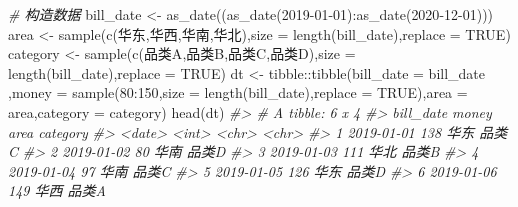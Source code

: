 \documentclass[
]{book}
\newenvironment{Shaded}{\begin{snugshade}}{\end{snugshade}}
\newcommand{\AttributeTok}[1]{\textcolor[rgb]{0.77,0.63,0.00}{#1}}
\newcommand{\CommentTok}[1]{\textcolor[rgb]{0.56,0.35,0.01}{\textit{#1}}}
\newcommand{\ConstantTok}[1]{\textcolor[rgb]{0.00,0.00,0.00}{#1}}
\newcommand{\DecValTok}[1]{\textcolor[rgb]{0.00,0.00,0.81}{#1}}
\newcommand{\FunctionTok}[1]{\textcolor[rgb]{0.00,0.00,0.00}{#1}}
\newcommand{\NormalTok}[1]{#1}
\newcommand{\OtherTok}[1]{\textcolor[rgb]{0.56,0.35,0.01}{#1}}
\newcommand{\SpecialCharTok}[1]{\textcolor[rgb]{0.00,0.00,0.00}{#1}}
\newcommand{\StringTok}[1]{\textcolor[rgb]{0.31,0.60,0.02}{#1}}
\begin{document}
\begin{Shaded}
\begin{Highlighting}[]
\CommentTok{\# 构造数据}
\NormalTok{bill\_date }\OtherTok{\textless{}{-}} \FunctionTok{as\_date}\NormalTok{((}\FunctionTok{as\_date}\NormalTok{(}\StringTok{\textquotesingle{}2019{-}01{-}01\textquotesingle{}}\NormalTok{)}\SpecialCharTok{:}\FunctionTok{as\_date}\NormalTok{(}\StringTok{\textquotesingle{}2020{-}12{-}01\textquotesingle{}}\NormalTok{)))}
\NormalTok{area }\OtherTok{\textless{}{-}}  \FunctionTok{sample}\NormalTok{(}\FunctionTok{c}\NormalTok{(}\StringTok{\textquotesingle{}华东\textquotesingle{}}\NormalTok{,}\StringTok{\textquotesingle{}华西\textquotesingle{}}\NormalTok{,}\StringTok{\textquotesingle{}华南\textquotesingle{}}\NormalTok{,}\StringTok{\textquotesingle{}华北\textquotesingle{}}\NormalTok{),}\AttributeTok{size =} \FunctionTok{length}\NormalTok{(bill\_date),}\AttributeTok{replace =} \ConstantTok{TRUE}\NormalTok{)}
\NormalTok{category }\OtherTok{\textless{}{-}} \FunctionTok{sample}\NormalTok{(}\FunctionTok{c}\NormalTok{(}\StringTok{\textquotesingle{}品类A\textquotesingle{}}\NormalTok{,}\StringTok{\textquotesingle{}品类B\textquotesingle{}}\NormalTok{,}\StringTok{\textquotesingle{}品类C\textquotesingle{}}\NormalTok{,}\StringTok{\textquotesingle{}品类D\textquotesingle{}}\NormalTok{),}\AttributeTok{size =} \FunctionTok{length}\NormalTok{(bill\_date),}\AttributeTok{replace =} \ConstantTok{TRUE}\NormalTok{)}
\NormalTok{dt }\OtherTok{\textless{}{-}}\NormalTok{ tibble}\SpecialCharTok{::}\FunctionTok{tibble}\NormalTok{(}\AttributeTok{bill\_date =}\NormalTok{ bill\_date ,}\AttributeTok{money =} \FunctionTok{sample}\NormalTok{(}\DecValTok{80}\SpecialCharTok{:}\DecValTok{150}\NormalTok{,}\AttributeTok{size =} \FunctionTok{length}\NormalTok{(bill\_date),}\AttributeTok{replace =} \ConstantTok{TRUE}\NormalTok{),}\AttributeTok{area =}\NormalTok{ area,}\AttributeTok{category =}\NormalTok{ category)}
\FunctionTok{head}\NormalTok{(dt)}
\CommentTok{\#\textgreater{} \# A tibble: 6 x 4}
\CommentTok{\#\textgreater{}   bill\_date  money area  category}
\CommentTok{\#\textgreater{}   \textless{}date\textgreater{}     \textless{}int\textgreater{} \textless{}chr\textgreater{} \textless{}chr\textgreater{}   }
\CommentTok{\#\textgreater{} 1 2019{-}01{-}01   138 华东  品类C   }
\CommentTok{\#\textgreater{} 2 2019{-}01{-}02    80 华南  品类D   }
\CommentTok{\#\textgreater{} 3 2019{-}01{-}03   111 华北  品类B   }
\CommentTok{\#\textgreater{} 4 2019{-}01{-}04    97 华南  品类C   }
\CommentTok{\#\textgreater{} 5 2019{-}01{-}05   126 华东  品类D   }
\CommentTok{\#\textgreater{} 6 2019{-}01{-}06   149 华西  品类A}
\end{Highlighting}
\end{Shaded}
\end{document}
